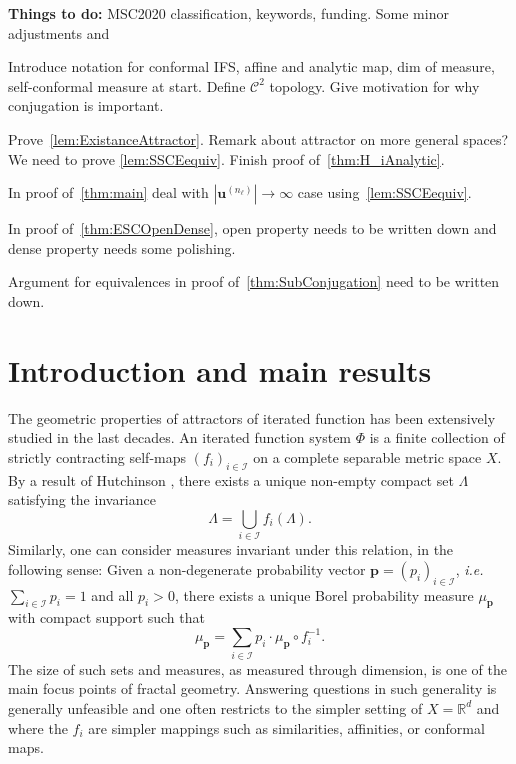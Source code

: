 \documentclass[12pt,]{article}
\def\cref#1{\ref{#1}}%
\theoremstyle{definition}
\theoremstyle{remark}
\newcommand{\0}{\mathbf{0}}
\newcommand{\ie}{{\it i.e.}\/ }
\newcommand{\bu}{\mathbf{u}}
\begin{document}
{{\color{blue}
\textbf{Things to do:}
MSC2020 classification, keywords, funding. Some minor adjustments and
\begin{description}
\item[\cref{sec:intro}] Introduce notation for conformal IFS, affine and analytic map, dim of
  measure, self-conformal measure at start. Define $\mathcal{C}^2$ topology. Give motivation for why
  conjugation is important. 
\item Prove~\cref{lem:ExistanceAttractor}. Remark about attractor on more general spaces?
  We need to prove \cref{lem:SSCEequiv}. Finish proof of~\cref{thm:H_iAnalytic}. 
\item[\cref{sec:ProofSufficientCond}] In proof of~\cref{thm:main} deal with $|\bu^{(n_\ell)}| \to
  \infty$ case using~\cref{lem:SSCEequiv}.
\item[\cref{sec:ProofESCOpenDense}] In proof of~\cref{thm:ESCOpenDense}, open property needs to be
  written down and dense property needs some polishing.
\item[\cref{sec:ProofConjugation}] Argument for equivalences in proof of~\cref{thm:SubConjugation}
  need to be written down.
\end{description}
}


%
%

\section{Introduction and main results} \label{sec:intro}
The geometric properties of attractors of iterated function has been extensively studied in the last
decades.
An iterated function system $\Phi$ is a finite collection of strictly contracting self-maps
$(f_i)_{i\in\mathcal{I}}$ on a complete separable metric space $X$. By a result of Hutchinson
\cite{Hutchinson_Attractor_81}, there exists a unique non-empty compact set $\Lambda$ satisfying the
invariance
\begin{equation}\label{eq:Hutchinson}
  \Lambda = \bigcup_{i\in\mathcal{I}} f_i(\Lambda).
\end{equation}
Similarly, one can consider measures invariant under this relation, in the following sense:
Given a non-degenerate probability vector $\mathbf{p}=(p_i)_{i\in\mathcal{I}}$, \ie
$\sum_{i\in\mathcal{I}}p_i=1$ and all $p_i>0$, there exists a unique Borel probability measure
$\mu_{\mathbf{p}}$ with compact support such that
\begin{equation}\label{eq:conformaMeasure}
\mu_{\mathbf{p}}=\sum_{i \in \mathcal{I}} p_i \cdot \mu_{\mathbf{p}} \circ f_i^{-1}.
\end{equation}
The size of such sets and measures, as measured through dimension, is one of the main focus points of fractal
geometry. Answering questions in such generality is generally unfeasible and one often restricts to
the simpler setting of $X=\mathbb{R}^d$ and where the $f_i$ are simpler mappings such as
similarities, affinities, or conformal maps.

}
\end{document}
